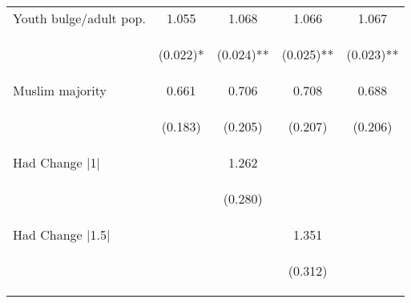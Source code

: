 \begin{center}
\begin{tabular}{lcccc}
\noalign{\smallskip}Youth bulge/adult pop. & 1.055 & 1.068 & 1.066 & 1.067\\
 & \begin{footnotesize}(0.022)*\end{footnotesize} & \begin{footnotesize}(0.024)**\end{footnotesize} & \begin{footnotesize}(0.025)**\end{footnotesize} & \begin{footnotesize}(0.023)**\end{footnotesize}\\
\noalign{\smallskip}Muslim majority & 0.661 & 0.706 & 0.708 & 0.688\\
 & \begin{footnotesize}(0.183)\end{footnotesize} & \begin{footnotesize}(0.205)\end{footnotesize} & \begin{footnotesize}(0.207)\end{footnotesize} & \begin{footnotesize}(0.206)\end{footnotesize}\\
\noalign{\smallskip}Had Change |1| &  & 1.262 &  & \\
 & \begin{footnotesize}\end{footnotesize} & \begin{footnotesize}(0.280)\end{footnotesize} & \begin{footnotesize}\end{footnotesize} & \begin{footnotesize}\end{footnotesize}\\
\noalign{\smallskip}Had Change |1.5| &  &  & 1.351 & \\
 & \begin{footnotesize}\end{footnotesize} & \begin{footnotesize}\end{footnotesize} & \begin{footnotesize}(0.312)\end{footnotesize} & \begin{footnotesize}\end{footnotesize}\\

\end{tabular}
\end{center}

